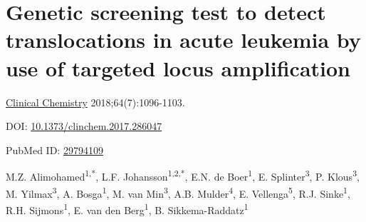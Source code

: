 \chapter[Genetic test to detect translocations in acute leukemia]{Genetic screening test to detect translocations in acute leukemia by use of targeted locus amplification}
\label{chap:TLA}

{ \Large {} }

\hfill \underline{Clinical Chemistry} 2018;64(7):1096-1103.

\hfill DOI: \href{https://doi.org/10.1373/clinchem.2017.286047}{10.1373/clinchem.2017.286047}

\hfill PubMed ID: \href{https://www.ncbi.nlm.nih.gov/pubmed/29794109}{29794109}

\newpage

\noindent
M.Z. Alimohamed\textsuperscript{1,*}, L.F. Johansson\textsuperscript{1,2,*}, E.N. de Boer\textsuperscript{1}, E. Splinter\textsuperscript{3}, P. Klous\textsuperscript{3}, M. Yilmax\textsuperscript{3}, A. Bosga\textsuperscript{1}, M. van Min\textsuperscript{3}, A.B. Mulder\textsuperscript{4}, E. Vellenga\textsuperscript{5}, R.J. Sinke\textsuperscript{1}, R.H. Sijmons\textsuperscript{1}, E. van den Berg\textsuperscript{1}, B. Sikkema-Raddatz\textsuperscript{1}  \\

